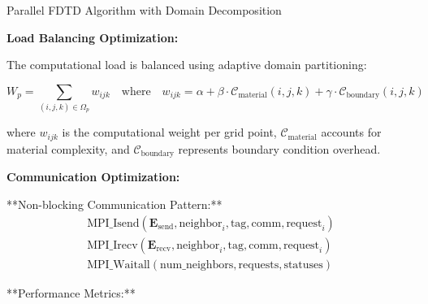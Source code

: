 \documentclass[11pt]{article}
\begin{document}
\begin{algorithm}[H]
\SetAlgoLined
{}
\caption{Parallel FDTD Algorithm with Domain Decomposition}
\end{algorithm}

\textbf{Load Balancing Optimization:}

The computational load is balanced using adaptive domain partitioning:

\begin{equation}
W_p = \sum_{(i,j,k) \in \Omega_p} w_{ijk} \quad \text{where} \quad w_{ijk} = \alpha + \beta \cdot \mathcal{C}_{\text{material}}(i,j,k) + \gamma \cdot \mathcal{C}_{\text{boundary}}(i,j,k)
\end{equation}

where $w_{ijk}$ is the computational weight per grid point, $\mathcal{C}_{\text{material}}$ accounts for material complexity, and $\mathcal{C}_{\text{boundary}}$ represents boundary condition overhead.

\textbf{Communication Optimization:}

**Non-blocking Communication Pattern:**
\begin{align}
\text{MPI\_Isend}(\mathbf{E}_{\text{send}}, \text{neighbor}_i, \text{tag}, \text{comm}, \text{request}_i) \\
\text{MPI\_Irecv}(\mathbf{E}_{\text{recv}}, \text{neighbor}_i, \text{tag}, \text{comm}, \text{request}_i) \\
\text{MPI\_Waitall}(\text{num\_neighbors}, \text{requests}, \text{statuses})
\end{align}

**Performance Metrics:**
\end{document}
